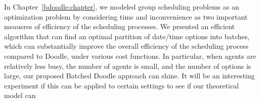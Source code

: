 \label{discussion:chapter}

In Chapter~\ref{bdoodle:chapter}, we modeled group scheduling problems as an optimization problem by considering time and inconvenience as two important meausres of efficiency of the scheduling processes. We prsented an efficient algorithm that can find an optimal partition of date/time options into batches, which can substantially improve the overall efficiency of the scheduling process compared to Doodle, under various cost functions. In particular, when agents are relatively less busy, the number of agents is small, and the number of options is large, our proposed Batched Doodle approach can shine. It will be an interesting experiment if this can be applied to certain settings to see if our theoretical model can  
